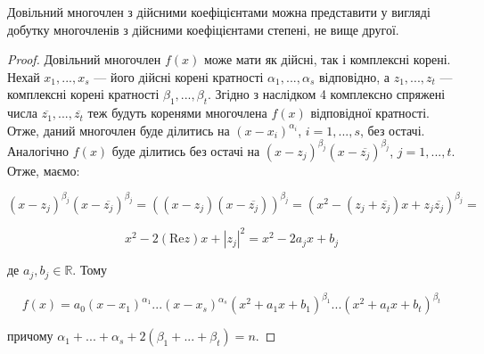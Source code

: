\begin{corollary}
	Довільний многочлен з дійсними коефіцієнтами можна
	представити у вигляді добутку многочленів з дійсними коефіцієнтами степені, не
	вище другої.
\end{corollary}
\begin{proof}
	Довільний многочлен $f(x)$ може мати як дійсні, так і комплексні
	корені. Нехай $x_1, ..., x_s$ --- його дійсні корені кратності $\alpha_1, ..., \alpha_s$ відповідно,
	а $z_1, ..., z_t$ --- комплексні корені кратності $\beta_1, ..., \beta_t$. Згідно з наслідком 4 комплексно спряжені
	числа $\overline{z_1}, ..., \overline{z_t}$ теж будуть коренями многочлена $f(x)$ відповідної кратності. Отже,
	даний многочлен буде ділитись на $(x - x_i)^{\alpha_i}$, $i = 1, ..., s$, без остачі. Аналогічно
	$f(x)$ буде ділитись без остачі на $(x - z_j)^{\beta_j} (x - \overline{z_j})^{\beta_j}$, 
	$j = 1, ..., t$. Отже, маємо:
	
	$$(x - z_j)^{\beta_j} (x - \overline{z_j})^{\beta_j} = ((x - z_j)(x - \overline{z_j}))^{\beta_j} = (x^2 - (z_j + \overline{z_j})x + z_j\overline{z_j})^{\beta_j} =$$
	
	$$x^2 - 2(\text{Re}z)x + |z_j|^2 = x^2 - 2a_jx + b_j$$	
		
	де $a_j, b_j \in \mathbb{R}$. Тому
	
	$$f(x) = a_0(x-x_1)^{\alpha_1} ... (x-x_s)^{\alpha_s} (x^2 + a_1x + b_1)^{\beta_1} ... (x^2 + a_tx + b_t)^{\beta_t}$$	

	причому $\alpha_1 + ... + \alpha_s + 2(\beta_1 + ... + \beta_t) = n$. 
\end{proof}


